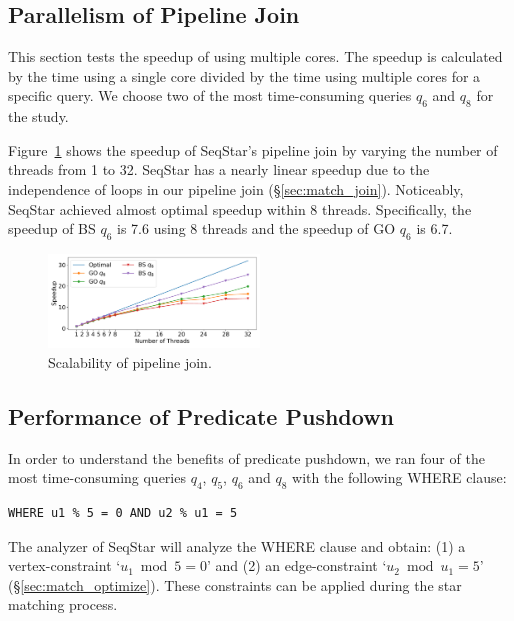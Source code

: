 \subsection{Parallelism of Pipeline Join}\label{sec:experiments_join}
This section tests the speedup of using multiple cores. The speedup is calculated by the time using a single core divided by the time using multiple cores for a specific query.
We choose two of the most time-consuming queries $q_6$ and $q_8$ for the study.

Figure~\ref{img:exp_scalability} shows the speedup of SeqStar's pipeline join by varying the number of threads from 1 to 32.
SeqStar has a nearly linear speedup due to the independence of loops in our pipeline join (\S\ref{sec:match_join}).
Noticeably, SeqStar achieved almost optimal speedup within 8 threads.
Specifically, the speedup of BS $q_6$ is 7.6 using 8 threads and the speedup of GO $q_6$ is 6.7.
\begin{figure}[ht]
  \centering
  \includegraphics[width=0.5\textwidth]{img/exp_scalability.pdf}
  \caption{Scalability of pipeline join.}\label{img:exp_scalability}
\end{figure}

\subsection{Performance of Predicate Pushdown}
In order to understand the benefits of predicate pushdown,
we ran four of the most time-consuming queries $q_4$, $q_5$, $q_6$ and $q_8$ with the following WHERE clause:
\begin{Verbatim}[fontsize=\small]
  WHERE u1 % 5 = 0 AND u2 % u1 = 5
\end{Verbatim}
The analyzer of SeqStar will analyze the WHERE clause and obtain:
(1) a vertex-constraint `$u_1 \bmod 5 = 0$' and (2) an edge-constraint `$u_2 \bmod u_1 = 5$' (\S\ref{sec:match_optimize}).
These constraints can be applied during the star matching process.


